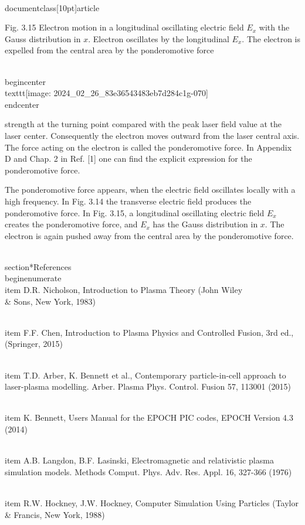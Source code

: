 \\documentclass[10pt]{article}
\begin{document}
Fig. 3.15 Electron motion in a longitudinal oscillating electric field $E_{x}$ with the Gauss distribution in $x$. Electron oscillates by the longitudinal $E_{x}$. The electron is expelled from the central area by the ponderomotive force

\\begin{center}
\\texttt{[image: 2024\_02\_26\_83e36543483eb7d284c1g-070]}
\\end{center}

strength at the turning point compared with the peak laser field value at the laser center. Consequently the electron moves outward from the laser central axis. The force acting on the electron is called the ponderomotive force. In Appendix D and Chap. 2 in Ref. [1] one can find the explicit expression for the ponderomotive force.

The ponderomotive force appears, when the electric field oscillates locally with a high frequency. In Fig. 3.14 the transverse electric field produces the ponderomotive force. In Fig. 3.15, a longitudinal oscillating electric field $E_{x}$ creates the ponderomotive force, and $E_{x}$ has the Gauss distribution in $x$. The electron is again pushed away from the central area by the ponderomotive force.

\\section*{References}
\\begin{enumerate}
  \\item D.R. Nicholson, Introduction to Plasma Theory (John Wiley \\& Sons, New York, 1983)

  \\item F.F. Chen, Introduction to Plasma Physics and Controlled Fusion, 3rd ed., (Springer, 2015)

  \\item T.D. Arber, K. Bennett et al., Contemporary particle-in-cell approach to laser-plasma modelling. Arber. Plasma Phys. Control. Fusion 57, 113001 (2015)

  \\item K. Bennett, Users Manual for the EPOCH PIC codes, EPOCH Version 4.3 (2014)

  \\item A.B. Langdon, B.F. Lasinski, Electromagnetic and relativistic plasma simulation models. Methods Comput. Phys. Adv. Res. Appl. 16, 327-366 (1976)

  \\item R.W. Hockney, J.W. Hockney, Computer Simulation Using Particles (Taylor \\& Francis, New York, 1988)
\end{document}
